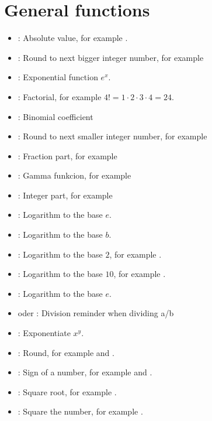 \chapter{General functions}

\begin{itemize}

\item
{}:
Absolute value, for example .

\item
{}:
Round to next bigger integer number, for example 

\item
{}:
Exponential function $e^x$.

\item
{}:
Factorial, for example $4!=1\cdot2\cdot3\cdot4=24$.

\item
{}:
Binomial coefficient

\item
{}:
Round to next smaller integer number, for example 

\item
{}:
Fraction part, for example 

\item
{}:
Gamma funkcion, for example 

\item
{}:
Integer part, for example 

\item
{}:
Logarithm to the base $e$.

\item
{}:
Logarithm to the base $b$.

\item
{}:
Logarithm to the base $2$, for example .

\item
{}:
Logarithm to the base $10$, for example .

\item
{}:
Logarithm to the base $e$.

\item
{} oder :
Division reminder when dividing a/b

\item
{}:
Exponentiate $x^y$.

\item
{}:
Round, for example  and .

\item
{}:
Sign of a number, for example  and .

\item
{}:
Square root, for example .

\item
{}:
Square the number, for example .

\end{itemize}
